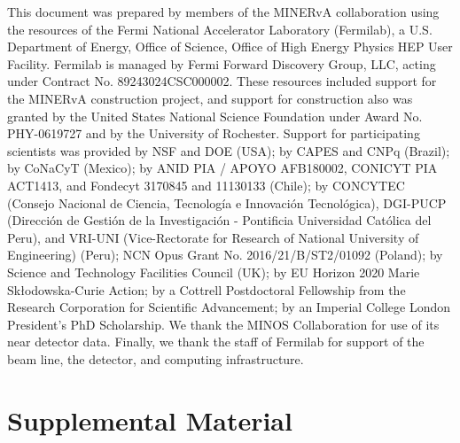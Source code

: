 \documentclass[aps,prd,twocolumn,showpacs,superscriptaddress,floatfix]{revtex4-2}  %
\begin{document}
\begin{acknowledgements}
This document was prepared by members of the MINERvA collaboration using the resources of the Fermi National Accelerator Laboratory (Fermilab), a U.S. Department of Energy, Office of Science, Office of High Energy Physics HEP User Facility. Fermilab is managed by Fermi Forward Discovery Group, LLC, acting under Contract No. 89243024CSC000002.  These resources included support for the MINERvA construction project, and support
for construction also
was granted by the United States National Science Foundation under
Award No. PHY-0619727 and by the University of Rochester. Support for
participating scientists was provided by NSF and DOE (USA); by CAPES
and CNPq (Brazil); by CoNaCyT (Mexico); by ANID PIA / APOYO AFB180002, CONICYT PIA ACT1413, and Fondecyt 3170845 and 11130133 (Chile); 
by CONCYTEC (Consejo Nacional de Ciencia, Tecnolog\'ia e Innovaci\'on Tecnol\'ogica), DGI-PUCP (Direcci\'on de Gesti\'on de la Investigaci\'on  - Pontificia Universidad Cat\'olica del Peru), and VRI-UNI (Vice-Rectorate for Research of National University of Engineering) (Peru); NCN Opus Grant No. 2016/21/B/ST2/01092 (Poland); by Science and Technology Facilities Council (UK); by EU Horizon 2020 Marie Skłodowska-Curie Action; by a Cottrell Postdoctoral Fellowship from the Research Corporation for Scientific Advancement; by an Imperial College London President's PhD Scholarship.  We thank the MINOS Collaboration for use of its near detector data. Finally, we thank the staff of
Fermilab for support of the beam line, the detector, and computing infrastructure.
\end{acknowledgements}



\pagebreak

\clearpage
\FloatBarrier
\section{Supplemental Material}
\renewcommand\thefigure{Supp.\arabic{figure}}
\setcounter{figure}{0}
\renewcommand\thetable{Supp.\Roman{table}}
\setcounter{table}{0}
\label{sec:supplemental}

\end{document}
